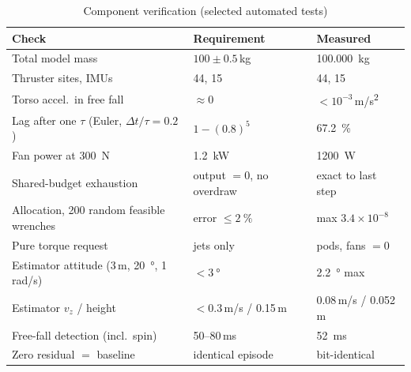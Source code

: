 \documentclass[conference]{IEEEtran}
\begin{document}
\begin{table}[t]
\centering
\caption{Component verification (selected automated tests)}
\label{tab:verif}
\setlength{\tabcolsep}{3pt}
\begin{tabular}{@{}p{3.6cm}p{2.0cm}p{2.2cm}@{}}
\toprule
Check & Requirement & Measured \\
\midrule
Total model mass & $100\pm0.5$\,kg & \SI{100.000}{kg} \\
Thruster sites, IMUs & 44, 15 & 44, 15 \\
Torso accel.\ in free fall & $\approx 0$ & $<10^{-3}$\,\si{m/s^2} \\
Lag after one $\tau$ (Euler, $\Delta t/\tau=0.2$) & $1-(0.8)^5$ & \SI{67.2}{\%} \\
Fan power at \SI{300}{N} & \SI{1.2}{kW} & \SI{1200}{W} \\
Shared-budget exhaustion & output $=0$, no overdraw & exact to last step \\
Allocation, 200 random feasible wrenches & error $\le\SI{2}{\%}$ & max $3.4\times10^{-8}$ \\
Pure torque request & jets only & pods, fans $=0$ \\
Estimator attitude (3\,m, \SI{20}{\degree}, 1\,rad/s) & $<\SI{3}{\degree}$ & \SI{2.2}{\degree} max \\
Estimator $v_z$ / height & $<0.3$\,m/s / 0.15\,m & 0.08\,m/s / 0.052\,m \\
Free-fall detection (incl.\ spin) & 50--80\,ms & \SI{52}{ms} \\
Zero residual $=$ baseline & identical episode & bit-identical \\
\bottomrule
\end{tabular}
\end{table}
\end{document}
